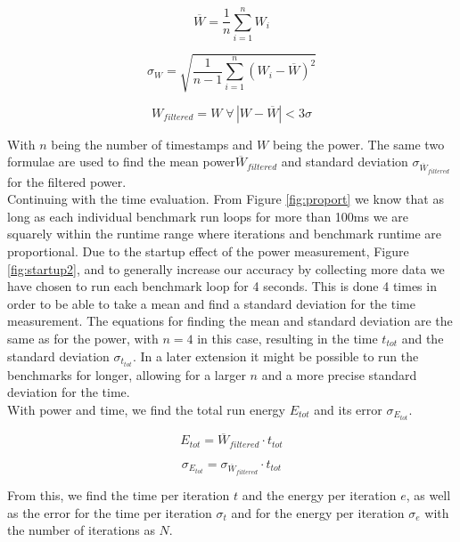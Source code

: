 \documentclass[conference]{IEEEtran}
\begin{document}
\begin{equation}
\overline{W} = \frac{1}{n} \sum_{i=1}^{n} W_i
\end{equation}

\begin{equation}
\sigma_W = \sqrt{\frac{1}{n - 1} \sum_{i=1}^{n} (W_i - \overline{W})^2}
\end{equation}

\begin{equation}
W_{filtered} = W \; \forall \, |W - \overline{W}| < 3 \sigma
\end{equation}

With \( n \) being the number of timestamps and \( W \) being the power. The same two formulae are used to find the mean power\( \overline{W}_{filtered} \) and standard deviation \( \sigma_{\overline{W}_{filtered}} \) for the filtered power. \\
Continuing with the time evaluation. From Figure \ref{fig:proport} we know that as long as each individual benchmark run loops for more than 100ms we are squarely within the runtime range where iterations and benchmark runtime are proportional. Due to the startup effect of the power measurement, Figure \ref{fig:startup2}, and to generally increase our accuracy by collecting more data we have chosen to run each benchmark loop for 4 seconds. This is done 4 times in order to be able to take a mean and find a standard deviation for the time measurement. The equations for finding the mean and standard deviation are the same as for the power, with $n=4$ in this case, resulting in the time \(t_{tot}\) and the standard deviation \(\sigma_{t_{tot}}\). In a later extension it might be possible to run the benchmarks for longer, allowing for a larger $n$ and a more precise standard deviation for the time. \\
With power and time, we find the total run energy \( E_{tot} \) and its error \( \sigma_{E_{tot}} \).

\begin{equation}
E_{tot} = \overline{W}_{filtered} \cdot t_{tot}
\end{equation}

\begin{equation}
\sigma_{E_{tot}} = \sigma_{\overline{W}_{filtered}} \cdot t_{tot}
\end{equation}

From this, we find the time per iteration \( t \) and the energy per iteration \( e \), as well as the error for the time per iteration \( \sigma_t \) and for the energy per iteration \( \sigma_e \) with the number of iterations as \( N \).
\end{document}
